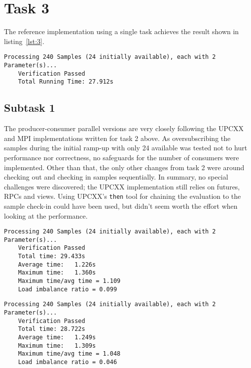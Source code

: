 \documentclass[11pt,a4paper]{article}
\begin{document}
\section{Task 3}
The reference implementation using a single task achieves the result shown in listing~\ref{lst:3}.

\begin{lstlisting}[basicstyle=\tiny, frame=single, caption={Task 3: Reference single-task implementation output.}, label={lst:3}]
	Processing 240 Samples (24 initially available), each with 2 Parameter(s)...
	Verification Passed
	Total Running Time: 27.912s
\end{lstlisting}

\subsection{Subtask 1}
The producer-consumer parallel versions are very closely following the UPCXX and MPI implementations written for task 2 above.
As oversubscribing the samples during the initial ramp-up with only 24 available was tested not to hurt performance nor
correctness, no safeguards for the number of consumers were implemented. Other than that, the only 
other changes from task 2 were around checking out and checking in samples sequentially. In summary, no special challenges
were discovered; the UPCXX implementation still relies on futures, RPCs and views. Using UPCXX's \texttt{then} tool
for chaining the evaluation to the sample check-in could have been used, but didn't seem worth the effort when looking at the performance.

\begin{lstlisting}[basicstyle=\tiny, frame=single, caption={Task 3: UPCXX producer-consumer parallel implementation output (n=24).}, label={lst:3UPCXX}]
	Processing 240 Samples (24 initially available), each with 2 Parameter(s)...
	Verification Passed
	Total time:	29.433s
	Average time:	1.226s
	Maximum time:	1.360s
	Maximum time/avg time = 1.109
	Load imbalance ratio = 0.099

\end{lstlisting}

\begin{lstlisting}[basicstyle=\tiny, frame=single, caption={Task 3: MPI producer-consumer parallel implementation output (n=24).}, label={lst:3MPI}]
	Processing 240 Samples (24 initially available), each with 2 Parameter(s)...
	Verification Passed
	Total time:	28.722s
	Average time:	1.249s
	Maximum time:	1.309s
	Maximum time/avg time = 1.048
	Load imbalance ratio = 0.046
\end{lstlisting}
\end{document}
